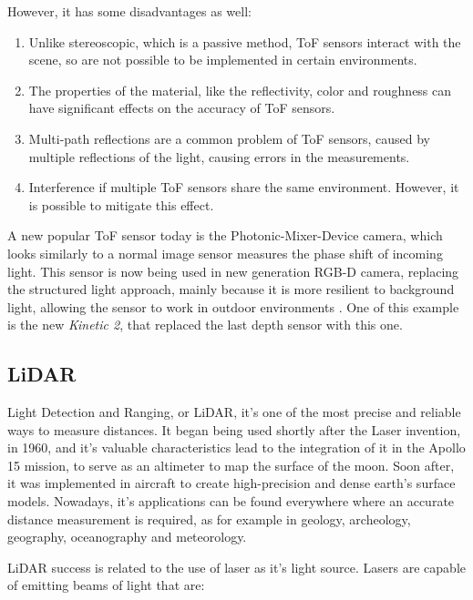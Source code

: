 However, it has some disadvantages as well:

\begin{enumerate}
    \item Unlike stereoscopic, which is a passive method, ToF sensors interact with the scene, so are not possible to be implemented in certain environments.
    \item The properties of the material, like the reflectivity, color and roughness can have significant effects on the accuracy of ToF sensors.
    \item Multi-path reflections are a common problem of ToF sensors, caused by multiple reflections of the light, causing errors in the measurements.
    \item Interference if multiple ToF sensors share the same environment. However, it is possible to mitigate this effect.
\end{enumerate}

A new popular ToF sensor today is the Photonic-Mixer-Device camera, which looks similarly to a normal image sensor measures the phase shift of incoming light. This sensor is now being used in new generation RGB-D camera, replacing the structured light approach, mainly because it is more resilient to background light, allowing the sensor to work in outdoor environments \cite{zollhoefer2018}. One of this example is the new \textit{Kinetic 2}, that replaced the last depth sensor with this one.

\subsection{LiDAR}

Light Detection and Ranging, or LiDAR, it's one of the most precise and reliable ways to measure distances. It began being used shortly after the Laser invention, in 1960, and it's valuable characteristics lead to the integration of it in the Apollo 15 mission, to serve as an altimeter to map the surface of the moon. Soon after, it was implemented in aircraft to create high-precision and dense earth's surface models. Nowadays, it's applications can be found everywhere where an accurate distance measurement is required, as for example in geology, archeology, geography, oceanography and meteorology.

LiDAR success is related to the use of laser as it's light source. Lasers are capable of emitting beams of light that are:

